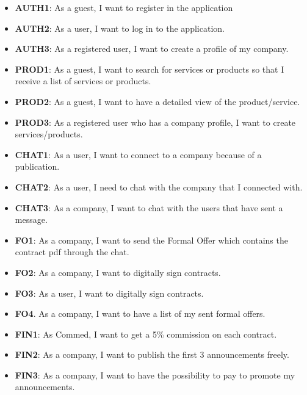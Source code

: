\documentclass[./main.tex]{subfiles}
\begin{document}
\begin{itemize}
	\item \textbf{AUTH1}: As a guest, I want to register in the application 
	\item \textbf{AUTH2}: As a user, I want to log in to the application. 
	\item \textbf{AUTH3}: As a registered user, I want to create a profile of my company.
	\item \textbf{PROD1}: As a guest, I want to search for services or products so that I receive a list of services or products.
	\item \textbf{PROD2}: As a guest, I want to have a detailed view of the product/service.
	\item \textbf{PROD3}: As a registered user who has a company profile, I want to create services/products.
	\item \textbf{CHAT1}: As a user, I want to connect to a company because of a publication.
	\item \textbf{CHAT2}: As a user, I need to chat with the company that I connected with.
	\item \textbf{CHAT3}: As a company, I want to chat with the users that have sent a message.
	\item \textbf{FO1}: As a company, I want to send the Formal Offer which contains the contract pdf through the chat.
	\item \textbf{FO2}: As a company, I want to digitally sign contracts.
	\item \textbf{FO3}: As a user, I want to digitally sign contracts.
	\item \textbf{FO4}. As a company, I want to have a list of my sent formal offers.
	\item \textbf{FIN1}: As Commed, I want to get a 5\% commission on each contract.
	\item \textbf{FIN2}: As a company, I want to publish the first 3 announcements freely.
	\item \textbf{FIN3}: As a company, I want to have the possibility to pay to promote my announcements.
\end{itemize}
\end{document}
